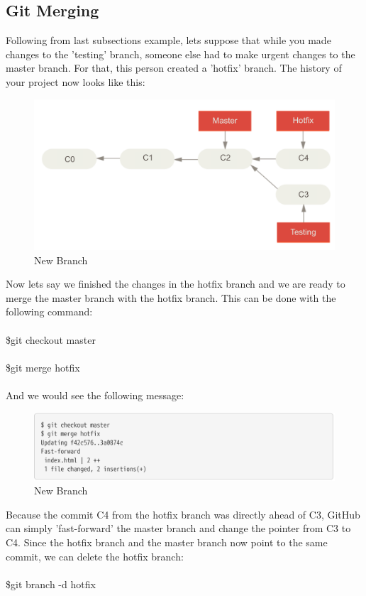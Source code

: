\documentclass[12pt]{article}
\begin{document}
    \subsection{Git Merging}
    Following from last subsection\textquotesingle s example, let\textquotesingle s suppose that while you made changes to the 'testing' branch, someone else had to make urgent changes to the master branch. For that, this person created a 'hotfix' branch. The history of your project now looks like this: 
    \vspace{0.3 in}
    \begin{figure}[h]
	\caption{New Branch}
	\includegraphics[scale=0.5]{figure7}
	\centering
    \end{figure} 
    \vspace{5 in}
    Now let\textquotesingle s say we finished the changes in the hotfix branch and we are ready to merge the master branch with the hotfix branch. This can be done with the following command:\\
    \\
    \indent\indent \$git checkout master \\ 
    \\
    \indent\indent \$git merge hotfix \\
    \\
    And we would see the following message: \\
    \begin{figure}[h]
	\caption{New Branch}
	\includegraphics[scale=0.5]{figure8}
	\centering
    \end{figure} 
    \vspace{0.2 in}
    Because the commit C4 from the hotfix branch was directly ahead of C3, GitHub can simply 'fast-forward' the master branch and change the pointer from C3 to C4. Since the hotfix branch and the master branch now point to the same commit, we can delete the hotfix branch: \\
    \\
    \indent\indent \$git branch -d hotfix 
\end{document}
